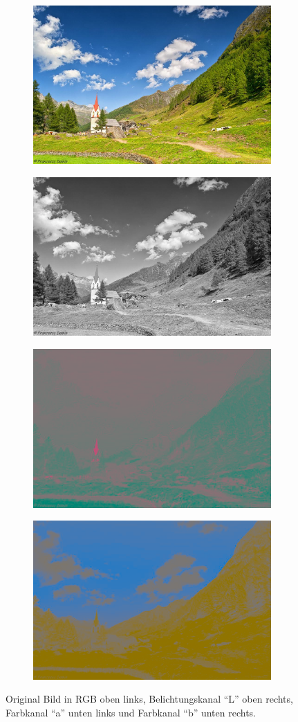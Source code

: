 \begin{figure}[H]
  \vspace{1cm}
  \centering
  \begin{subfigure}
    \centering
    \includegraphics[width=.35\textwidth]{resources/colorspace/image.jpg}
  \end{subfigure}
  \begin{subfigure}
    \centering
    \includegraphics[width=.35\textwidth]{resources/colorspace/grayscale.png}
  \end{subfigure}


  \begin{subfigure}
    \centering
    \includegraphics[width=.35\textwidth]{resources/colorspace/a_channel.png}
  \end{subfigure}
  \begin{subfigure}
    \centering
    \includegraphics[width=.35\textwidth]{resources/colorspace/b_channel.png}
  \end{subfigure}
  \caption{Original Bild in RGB oben links, Belichtungskanal ``L'' oben rechts, Farbkanal ``a'' unten links und Farbkanal ``b'' unten rechts.}
  \label{image:farbraum}
\end{figure}


